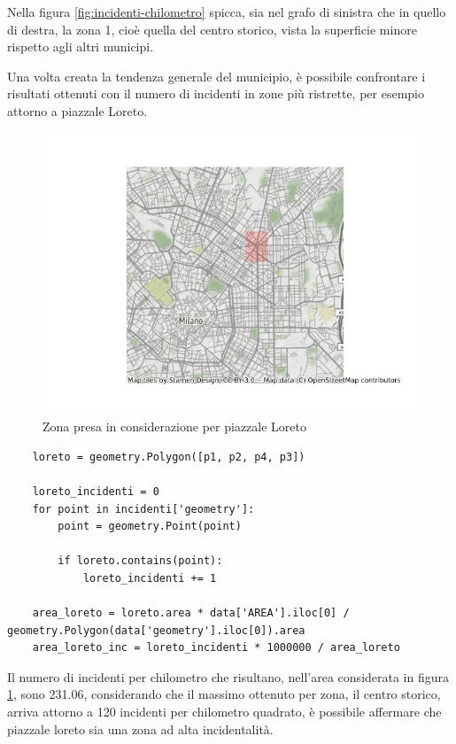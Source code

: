 \documentclass[a4paper]{report}
\begin{document}
Nella figura \ref{fig:incidenti-chilometro} spicca, sia nel grafo di sinistra che in quello di destra, 
la zona 1, cioè quella del centro storico, vista la superficie minore rispetto agli altri municipi.

Una volta creata la tendenza generale del municipio, è possibile confrontare i risultati 
ottenuti con il numero di incidenti in zone più ristrette, per esempio attorno a piazzale Loreto.

\begin{figure}
    \includegraphics[width=\linewidth]{../src/municipi_milano/zona_loreto.png}
    \caption{Zona presa in considerazione per piazzale Loreto}
    \label{fig:zona-loreto}
\end{figure}

\begin{lstlisting}
    loreto = geometry.Polygon([p1, p2, p4, p3])

    loreto_incidenti = 0
    for point in incidenti['geometry']: 
        point = geometry.Point(point)

        if loreto.contains(point): 
            loreto_incidenti += 1

    area_loreto = loreto.area * data['AREA'].iloc[0] / geometry.Polygon(data['geometry'].iloc[0]).area
    area_loreto_inc = loreto_incidenti * 1000000 / area_loreto
\end{lstlisting}

Il numero di incidenti per chilometro che risultano, nell'area considerata in figura 
\ref{fig:zona-loreto}, sono 231.06, considerando che il massimo ottenuto per zona, 
il centro storico, arriva attorno a 120 incidenti per chilometro quadrato, è possibile affermare 
che piazzale loreto sia una zona ad alta incidentalità.
\end{document}
